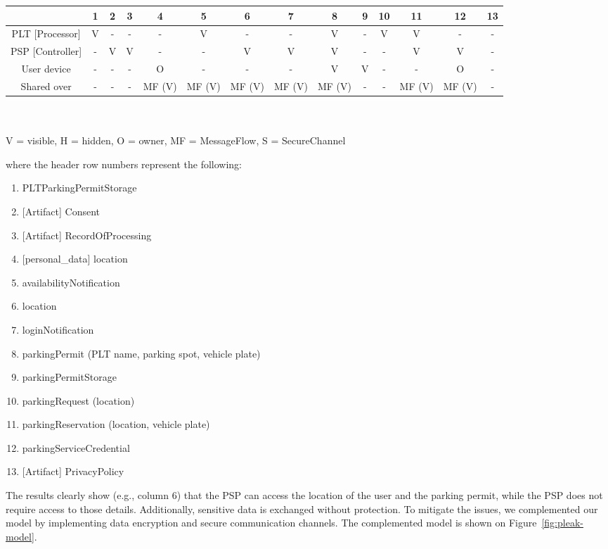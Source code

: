 \begin{center}
\begin{tabular}{ |c||c|c|c|c|c|c|c|c|c|c|c|c|c| } 
    \hline
    & 1 & 2 & 3 & 4 & 5 & 6 & 7 & 8 & 9 & 10 & 11 & 12 & 13\\ 
    \hline
    \hline
    PLT [Processor] & V & - & - & - & V & - & - & V & - & V & V & - & -\\
    \hline
    PSP [Controller] & - & V & V & - & - & V & V & V & - & - & V & V & -\\
    \hline
    User device & - & - & - & O & - & - & - & V & V & - & - & O & -\\
    \hline
    \hline
    Shared over & - & - & - &
    \multicolumn{1}{m{1.2em}|}{MF (V)} &
    \multicolumn{1}{m{1.2em}|}{MF (V)} &
    \multicolumn{1}{m{1.2em}|}{MF (V)} &
    \multicolumn{1}{m{1.2em}|}{MF (V)} &
    \multicolumn{1}{m{1.2em}|}{MF (V)} &
    - & - &
    \multicolumn{1}{m{1.2em}|}{MF (V)} &
    \multicolumn{1}{m{1.2em}|}{MF (V)} & -\\
    \hline
\end{tabular}
\\~\\
V = visible, H = hidden, O = owner, MF = MessageFlow, S = SecureChannel
\end{center}
where the header row numbers represent the following:
\begin{enumerate}
    \item PLTParkingPermitStorage
    \item {[Artifact]} Consent
    \item {[Artifact]} RecordOfProcessing
    \item {[personal\_data]} location
    \item availabilityNotification
    \item location
    \item loginNotification
    \item parkingPermit (PLT name, parking spot, vehicle plate)
    \item parkingPermitStorage
    \item parkingRequest (location)
    \item parkingReservation (location, vehicle plate)
    \item parkingServiceCredential
    \item {[Artifact]} PrivacyPolicy
\end{enumerate}

The results clearly show (e.g., column 6) that the PSP can access the location
of the user and the parking permit, while the PSP does not require access to
those details. Additionally, sensitive data is exchanged without protection. To
mitigate the issues, we complemented our model by implementing data encryption
and secure communication channels. The complemented model is shown on
Figure~\ref{fig:pleak-model}.

